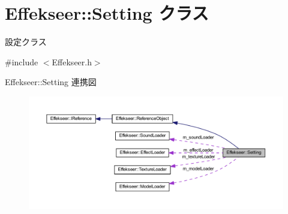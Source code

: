 \hypertarget{class_effekseer_1_1_setting}{}\section{Effekseer\+:\+:Setting クラス}
\label{class_effekseer_1_1_setting}


設定クラス  




{\ttfamily \#include $<$Effekseer.\+h$>$}



Effekseer\+:\+:Setting 連携図\nopagebreak
\begin{figure}[H]
\begin{center}
\leavevmode
\includegraphics[width=350pt]{class_effekseer_1_1_setting__coll__graph}
\end{center}
\end{figure}
